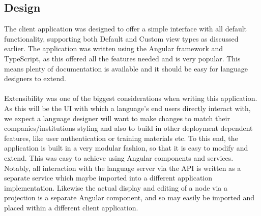 \documentclass{article}
\begin{document}
{\subsection{Design}
The client application was designed to offer a simple interface with all default functionality, supporting both Default and Custom view types as discussed earlier. The application was written using the Angular framework and TypeScript, as this offered all the features needed and is very popular. This means plenty of documentation is available and it should be easy for language designers to extend.
\\
\\
Extensibility was one of the biggest considerations when writing this application. As this will be the UI with which a language's end users directly interact with, we expect a language designer will want to make changes to match their companies/institutions styling and also to build in other  deployment dependent features, like user authentication or training materials etc. To this end, the application is built in a very modular fashion, so that it is easy to modify and extend. This was easy to achieve using Angular components and services. Notably, all interaction with the language server via the API is written as a separate service which maybe imported into a different application implementation. Likewise the actual display and editing of a node via a projection is a separate Angular component, and so may easily be imported and placed within a different client application.
}
\end{document}
